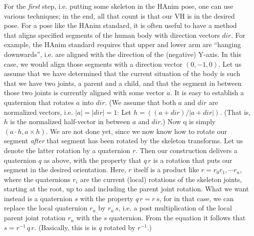 For the \emph{first} step, i.e. putting some skeleton in the HAnim pose, one can use various techniques;
in the end, all that count is that our VH is in the desired pose.
For a pose like the HAnim standard, it is often useful to have a method that aligns specified segments
of the human body with direction vectors $\mathit{dir}$. For example, the HAnim standard requires that upper and lower arm
are ``hanging downwards'', i.e. are aligned with the direction of the (negative) Y-axis.
In this case, we would align those segments with a direction vector $(0, -1, 0)$.
Let us assume that we have determined that the current situation of the body is such that we
have two joints, a parent and a child, and that the segment in between those two joints is currently
aligned with some vector $a$.
It is easy to establish a quaternion that rotates $a$ into $\mathit{dir}$.
(We assume that both $a$ and $\mathit{dir}$ are normalized vectors, i.e. $|a| = |\mathit{dir}| = 1$:
Let $h = ( (a+\mathit{dir})/ |a+\mathit{dir}|)$. (That is, $h$ is the normalized half-vector in between $a$ and $\mathit{dir}$.)
Now q is simply $(a\cdot h, a\times h)$. We are not done yet, since we now know how to rotate our segment \emph{after} that segment
has been rotated by the skeleton transforms. Let us denote the latter rotation by a quaternion $r$.
Then our construction delivers a quaternion $q$ as above, with the property that $q\,r$ is a rotation that puts our segment
in the desired orientation. Here, $r$ itself is a product like $r = r_0 r_1, \cdots r_n$, where the quaternions $r_i$ are
the current (local) rotations of the skeleton joints, starting at the root, up to and including the parent joint rotation.
 What we want instead is a quaternion $s$ with the property $q\, r = r\, s$,
for in that case, we can replace the local quaternion $r_n$ by $r_n\, s$, i.e. a post multiplication
of the local parent joint rotation $r_n$  with the $s$ quaternion. From the equation it follows
that $ s= r^{-1}\, q\,r$. (Basically, this is is $q$ rotated by $r^{-1}$.)








